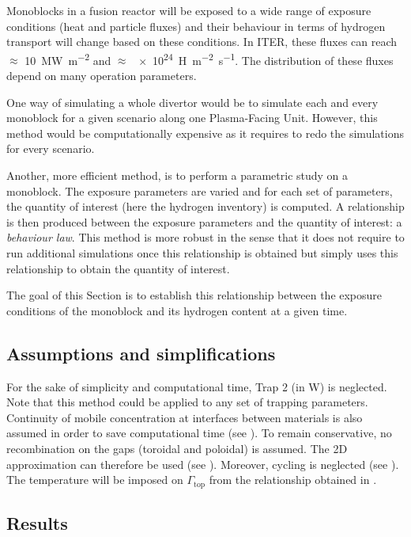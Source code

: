 Monoblocks in a fusion reactor will be exposed to a wide range of exposure conditions (heat and particle fluxes) and their behaviour in terms of hydrogen transport will change based on these conditions.
In ITER, these fluxes can reach $\approx$ \SI{10}{MW.m^{-2}} and $\approx$ \SI{e24}{H.m^{-2}.s^{-1}}.
The distribution of these fluxes depend on many operation parameters.

One way of simulating a whole divertor would be to simulate each and every monoblock for a given scenario along one Plasma-Facing Unit.
However, this method would be computationally expensive as it requires to redo the simulations for every scenario.

Another, more efficient method, is to perform a parametric study on a monoblock.
The exposure parameters are varied and for each set of parameters, the quantity of interest (here the hydrogen inventory) is computed.
A relationship is then produced between the exposure parameters and the quantity of interest: a \textit{behaviour law}.
This method is more robust in the sense that it does not require to run additional simulations once this relationship is obtained but simply uses this relationship to obtain the quantity of interest.

The goal of this Section is to establish this relationship between the exposure conditions of the monoblock and its hydrogen content at a given time.

\subsection{Assumptions and simplifications}

For the sake of simplicity and computational time, Trap 2 (in W) is neglected.
Note that this method could be applied to any set of trapping parameters.
Continuity of mobile concentration at interfaces between materials is also assumed in order to save computational time (see ).
To remain conservative, no recombination on the gaps (toroidal and poloidal) is assumed.
The 2D approximation can therefore be used (see ).
Moreover, cycling is neglected (see ).
The temperature will be imposed on $\Gamma_\mathrm{top}$ from the relationship obtained in .


\subsection{Results}

